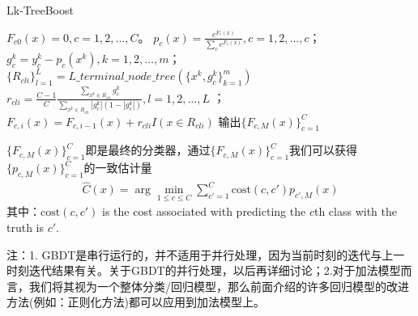               \begin{algorithm}[H]
                  \caption{Lk-TreeBoost}\label{code:Lk-TreeBoost}
                  \begin{algorithmic}[1]
                      \State $F_{c0}(x) = 0,c = 1,2,\dots,C$。
                          \State $p_c(x) = \frac{e^{F_c(x)}}{\sum_c e^{F_c(x)}},c=1,2,\dots,c$；
                              \State $g_c^k = y_c^k - p_c(x^k),k=1,2,\dots,m$；
                              \State $\{R_{cli}\}_{l=1}^L = L\_terminal\_node\_tree(\{x^k,g_c^k\}_{k=1}^m)$
                              \State $r_{cli} = \frac{C-1}{C} \frac{\sum_{x^k\in R_{cli}}g_c^k}{\sum_{x^k\in R_{cli}}|g_{c}^k|(1-|g_c^k|)},l=1,2,\dots,L$ ；
                              \State $F_{c,i}(x) = F_{c,i-1}(x) + r_{cli}I(x\in R_{cli})$
                          \EndFor
                      \EndFor
                      \State 输出$\{F_{c,M}(x)\}_{c=1}^C$
                  \end{algorithmic}
              \end{algorithm}
              \par
              $\{F_{c,M}(x)\}_{c=1}^C$即是最终的分类器，通过$\{F_{c,M}(x)\}_{c=1}^C$我们可以获得$\{p_{c,M}(x)\}_{c=1}^C$的一致估计量
              \begin{align*}
              \hat{C}(x) = \arg\min_{1 \leqslant c \leqslant C}\sum_{c'=1}^C \mathrm{cost}(c,c')p_{c',M}(x)
              \end{align*}
              其中：$\mathrm{cost}(c,c')$ is the cost associated with predicting the $c$th class with the truth is $c'$.
              \par
              注：1. GBDT是串行运行的，并不适用于并行处理，因为当前时刻的迭代与上一时刻迭代结果有关。关于GBDT的并行处理，以后再详细讨论；2.对于加法模型而言，我们将其视为一个整体分类/回归模型，那么前面介绍的许多回归模型的改进方法(例如：正则化方法)都可以应用到加法模型上。

